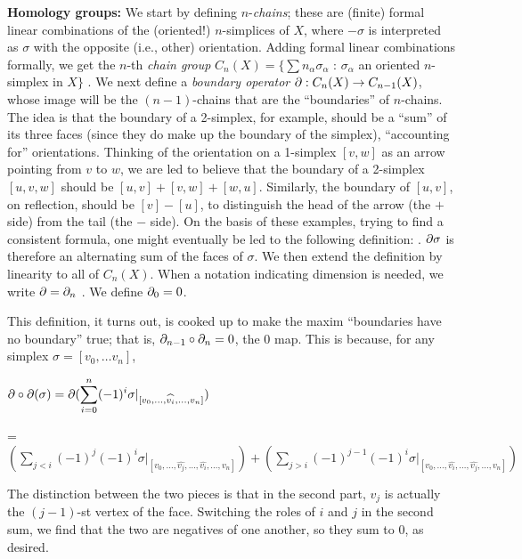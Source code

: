 {\bf Homology groups:} We start by defining $n$-{\it chains};
these are (finite) formal linear combinations of the (oriented!) $n$-simplices
of $X$, where $-\sigma$ is interpreted as $\sigma$ with the opposite
(i.e., other) orientation. Adding formal linear combinations formally,
we get the $n$-th {\it chain group} 
$C_n(X) = \{\sum n_\alpha \sigma_\alpha$ : $\sigma_\alpha$ an oriented $n$-simplex in $X\}$ .
We next define a {\it boundary operator} $\partial:C_n(X)\rightarrow C_{n-1}(X)$, whose image will be 
the $(n-1)$-chains that are the ``boundaries'' of $n$-chains. The idea is that the boundary of a 2-simplex,
for example, should be a ``sum'' of its three faces (since they do make up the boundary of the 
simplex), ``accounting for'' orientations. Thinking of the orientation on a 1-simplex $[v,w]$ 
as an arrow pointing from $v$ to $w$, we are led to 
believe that the boundary of a 2-simplex $[u,v,w]$ should be $[u,v]+[v,w]+[w,u]$. Similarly, the boundary 
of $[u,v]$, on reflection, should be $[v]-[u]$, to distinguish the head of the arrow (the $+$ side) from the
tail (the $-$ side). On the basis of these examples, trying to find a consistent formula, one might eventually
be led to the following definition:
 .
$\partial\sigma$ is therefore an alternating sum of the faces of $\sigma$. 
We then extend the definition by linearity to all of $C_n(X)$. When a notation indicating
dimension is needed, we write $\partial=\partial_n$ . We define $\partial_0=0$. 

\vfill
\eject

This definition, it turns out, is cooked up to make the maxim ``boundaries have no boundary'' true;
that is, $\partial_{n-1}\circ \partial_n = 0$, the $0$ map. This is because, for any simplex
$\sigma = [v_0,\ldots v_n]$, 

\msk

$\displaystyle \partial\circ\partial(\sigma) = 
\partial(\sum_{i=0}^n  (-1)^i\sigma|_{[v_0,\ldots,\widehat{v_{i}},\ldots ,v_n]})$

= $\displaystyle (\sum_{j<i}(-1)^j(-1)^i\sigma|_{[v_0,\ldots,\widehat{v_{j}},\ldots,\widehat{v_{i}},\ldots ,v_n]})
+(\sum_{j>i}(-1)^{j-1}(-1)^i\sigma|_{[v_0,\ldots,\widehat{v_{i}},\ldots,\widehat{v_{j}},\ldots ,v_n]})$

\msk

The distinction between the two pieces is that in the second part, $v_j$ is actually the $(j-1)$-st vertex
of the face. Switching the roles of $i$ and $j$ in the second sum, we find that the two are
negatives of one another, so they sum to $0$, as desired.

